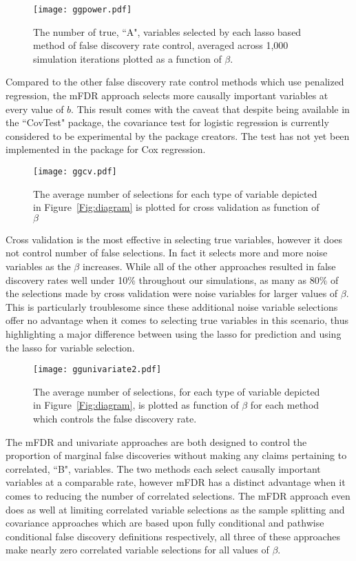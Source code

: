 \begin{figure} [!htb]
 \centering
  \texttt{[image: ggpower.pdf]}
  \caption{\label{Fig:lassopower} The number of true, ``A", variables selected by each lasso based method of false discovery rate control, averaged across 1,000 simulation iterations plotted as a function of $\beta$.}
\end{figure}

Compared to the other false discovery rate control methods which use penalized regression, the mFDR approach selects more causally important variables at every value of $b$. This result comes with the caveat that despite being available in the ``CovTest" package, the covariance test for logistic regression is currently considered to be experimental by the package creators. The test has not yet been implemented in the package for Cox regression. 

\begin{figure} [!htb]
 \centering
  \texttt{[image: ggcv.pdf]}
  \caption{The average number of selections for each type of variable depicted in Figure~\ref{Fig:diagram} is plotted for cross validation as function of $\beta$ }
\end{figure}

Cross validation is the most effective in selecting true variables, however it does not control number of false selections. In fact it selects more and more noise variables as the $\beta$ increases. While all of the other approaches resulted in false discovery rates well under 10\% throughout our simulations, as many as $80\%$ of the selections made by cross validation were noise variables for larger values of $\beta$. This is particularly troublesome since these additional noise variable selections offer no advantage when it comes to selecting true variables in this scenario, thus highlighting a major difference between using the lasso for prediction and using the lasso for variable selection.

\begin{figure} [!htb]
 \centering
  \texttt{[image: ggunivariate2.pdf]}
  \caption{The average number of selections, for each type of variable depicted in Figure~\ref{Fig:diagram}, is plotted as function of $\beta$ for each method which controls the false discovery rate.}
\end{figure}

The mFDR and univariate approaches are both designed to control the proportion of marginal false discoveries without making any claims pertaining to correlated, ``B", variables. The two methods each select causally important variables at a comparable rate, however mFDR has a distinct advantage when it comes to reducing the number of correlated selections. The mFDR approach even does as well at limiting correlated variable selections as the sample splitting and covariance approaches which are based upon fully conditional and pathwise conditional false discovery definitions respectively, all three of these approaches make nearly zero correlated variable selections for all values of $\beta$. 

